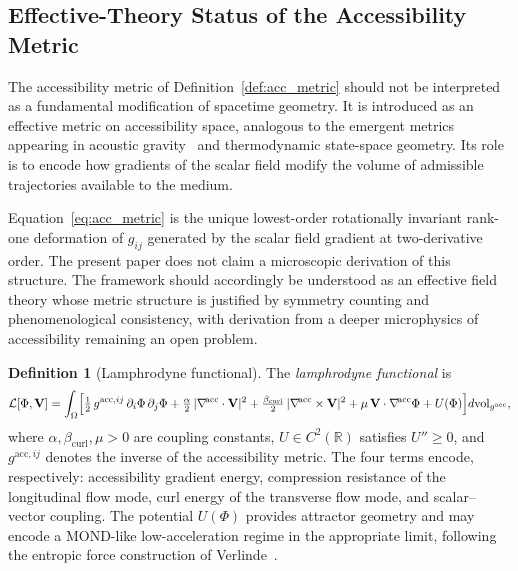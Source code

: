 \documentclass[12pt,a4paper]{article}
\theoremstyle{plain}
\theoremstyle{definition}
\newtheorem{definition}[theorem]{Definition}
\theoremstyle{remark}
\newcommand{\Lacc}{\mathcal{L}}
\newcommand{\nabacc}{\nabla^{\!\mathrm{acc}}}
\newcommand{\bcurl}{\beta_{\mathrm{curl}}}
\begin{document}
\subsection{Effective-Theory Status of the Accessibility Metric}
\label{subsec:effective_metric}

The accessibility metric of Definition~\ref{def:acc_metric} should not be
interpreted as a fundamental modification of spacetime geometry. It is introduced
as an effective metric on accessibility space, analogous to the emergent metrics
appearing in acoustic gravity~\cite{MisnerThorneWheeler1973} and thermodynamic
state-space geometry. Its role is to encode how gradients of the scalar field
modify the volume of admissible trajectories available to the medium.

Equation~\eqref{eq:acc_metric} is the unique lowest-order rotationally invariant
rank-one deformation of $g_{ij}$ generated by the scalar field gradient at
two-derivative order. The present paper does not claim a microscopic derivation
of this structure. The framework should accordingly be understood as an effective
field theory whose metric structure is justified by symmetry counting and
phenomenological consistency, with derivation from a deeper microphysics of
accessibility remaining an open problem.

\begin{definition}[Lamphrodyne functional]
\label{def:lamp_functional}
The \emph{lamphrodyne functional} is
\begin{equation}
  \Lacc[\Phi,\mathbf{V}]
  = \int_{\Omega}
    \Bigl[
      \tfrac{1}{2}\,g^{\mathrm{acc},ij}\,\partial_i\Phi\,\partial_j\Phi
      + \tfrac{\alpha}{2}\,|\nabacc\cdot\mathbf{V}|^2
      + \tfrac{\bcurl}{2}\,|\nabacc\times\mathbf{V}|^2
      + \mu\,\mathbf{V}\cdot\nabacc\Phi
      + U(\Phi)
    \Bigr]
    d\mathrm{vol}_{g^{\mathrm{acc}}},
  \label{eq:lamp_functional}
\end{equation}
where $\alpha, \bcurl, \mu > 0$ are coupling constants, $U \in C^2(\mathbb{R})$
satisfies $U'' \geq 0$, and $g^{\mathrm{acc},ij}$ denotes the inverse of the
accessibility metric. The four terms encode, respectively: accessibility gradient
energy, compression resistance of the longitudinal flow mode, curl energy of the
transverse flow mode, and scalar--vector coupling. The potential $U(\Phi)$ provides
attractor geometry and may encode a MOND-like low-acceleration regime in the
appropriate limit, following the entropic force construction of Verlinde~\cite{Verlinde2011}.
\end{definition}
\end{document}
